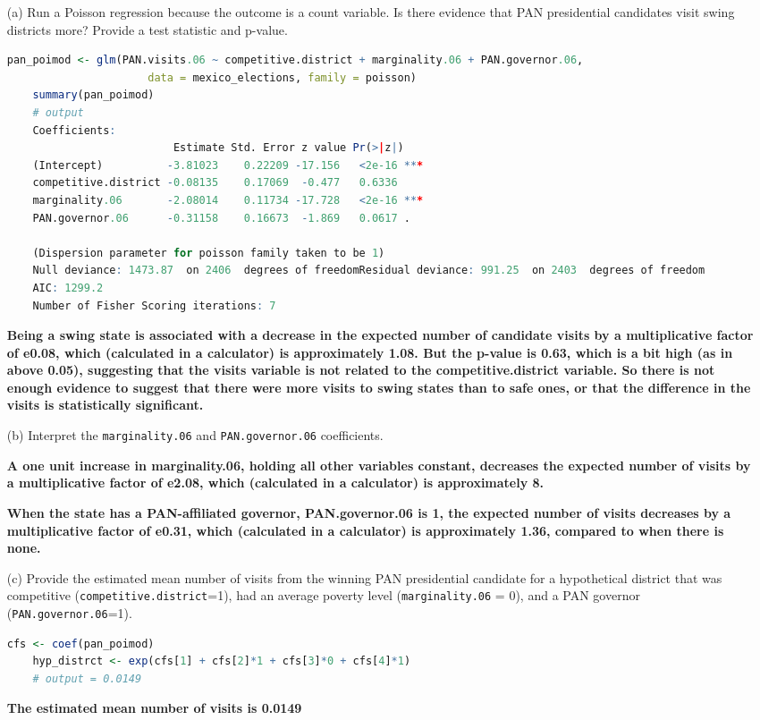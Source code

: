 \documentclass[12pt,letterpaper]{article}
\begin{document}
\begin{enumerate}
	\item [(a)]
	Run a Poisson regression because the outcome is a count variable. Is there evidence that PAN presidential candidates visit swing districts more? Provide a test statistic and p-value.
\begin{lstlisting}[language=R]
	pan_poimod <- glm(PAN.visits.06 ~ competitive.district + marginality.06 + PAN.governor.06,                  
	                  data = mexico_elections, family = poisson)
	summary(pan_poimod)
	# output
	Coefficients:                     
	                      Estimate Std. Error z value Pr(>|z|)    
	(Intercept)          -3.81023    0.22209 -17.156   <2e-16 ***
	competitive.district -0.08135    0.17069  -0.477   0.6336    
	marginality.06       -2.08014    0.11734 -17.728   <2e-16 ***
	PAN.governor.06      -0.31158    0.16673  -1.869   0.0617 .  
	
    (Dispersion parameter for poisson family taken to be 1)    
	Null deviance: 1473.87  on 2406  degrees of freedomResidual deviance: 991.25  on 2403  degrees of freedom
	AIC: 1299.2
	Number of Fisher Scoring iterations: 7
\end{lstlisting}	
\textbf{Being a swing state is associated with a decrease in the expected number of candidate visits by a multiplicative factor of e0.08,  which (calculated in a calculator) is approximately 1.08. But the p-value is 0.63, which is a bit high (as in above 0.05), suggesting that the visits variable is not related to the competitive.district variable. So there is not enough evidence to suggest that there were more visits to swing states than to safe ones, or that the difference in the visits is statistically significant.}
	\item [(b)]
	Interpret the \texttt{marginality.06} and \texttt{PAN.governor.06} coefficients.
	
\textbf{A one unit increase in marginality.06, holding all other variables constant, decreases the expected number of visits by a multiplicative factor of e2.08, which (calculated in a calculator) is approximately 8.}

\textbf{When the state has a PAN-affiliated governor,  PAN.governor.06 is 1, the expected number of visits decreases by a multiplicative factor of e0.31, which (calculated in a calculator) is approximately 1.36, compared to when there is none.}	
	\item [(c)]
	Provide the estimated mean number of visits from the winning PAN presidential candidate for a hypothetical district that was competitive (\texttt{competitive.district}=1), had an average poverty level (\texttt{marginality.06} = 0), and a PAN governor (\texttt{PAN.governor.06}=1).
\begin{lstlisting}[language=R]
	cfs <- coef(pan_poimod)
	hyp_distrct <- exp(cfs[1] + cfs[2]*1 + cfs[3]*0 + cfs[4]*1)
	# output = 0.0149
\end{lstlisting}	
\textbf{The estimated mean number of visits is 0.0149}		
\end{enumerate}
\end{document}
